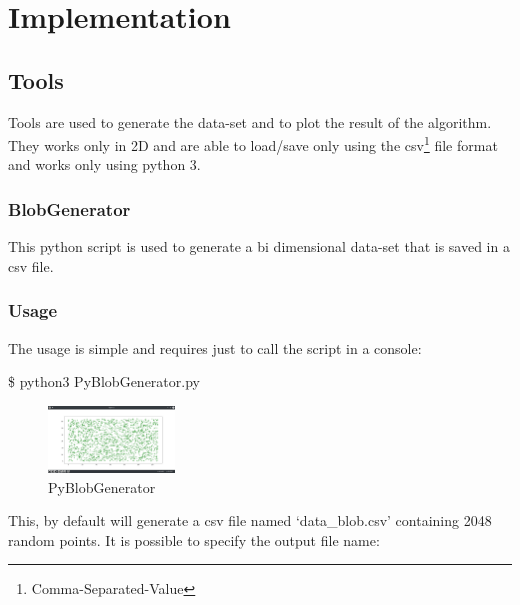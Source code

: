 \documentclass[10pt,twocolumn,letterpaper]{article}
\newenvironment{Shaded}{}{}
\newcommand{\ExtensionTok}[1]{#1}
\newcommand{\NormalTok}[1]{#1}
\begin{document}
\section{Implementation}
\subsection{Tools}
Tools are used to generate the data-set and to plot the result of the algorithm.\newline
They works only in 2D and are able to load/save only using the csv\footnote{Comma-Separated-Value} file format and works only
using python 3.
\subsubsection{BlobGenerator}
This python script is used to generate a bi dimensional data-set that is saved in a csv file.\newline
\subsubsection{Usage}
The usage is simple and requires just to call the script in a console:\newline
\begin{Shaded}
\begin{Highlighting}[]
\NormalTok{\$ }\ExtensionTok{python3}\NormalTok{ PyBlobGenerator.py }
\end{Highlighting}
\end{Shaded}

\begin{figure}[H]
\centering
\includegraphics[width=0.3\textwidth]{Py_Blob_Generator}
\caption{PyBlobGenerator}
\end{figure}

This, by default will generate a csv file named `data\_blob.csv' containing 2048 random points.\newline
It is possible to specify the output file name:\newline
\end{document}
